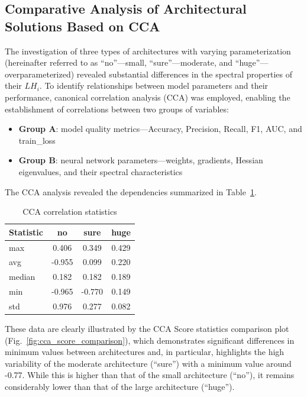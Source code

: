 \documentclass[a4paper,12pt]{article}
\begin{document}
\subsection{Comparative Analysis of Architectural Solutions Based on CCA}

The investigation of three types of architectures with varying parameterization (hereinafter referred to as
``no''—small, ``sure''—moderate, and ``huge''—overparameterized) revealed substantial differences in the
spectral properties of their $LH_i$. To identify relationships between model parameters and their
performance, canonical correlation analysis (CCA) was employed, enabling the establishment of correlations
between two groups of variables:

\begin{itemize}
  \item \textbf{Group A}: model quality metrics—Accuracy, Precision, Recall, F1, AUC, and train\_loss
  \item \textbf{Group B}: neural network parameters—weights, gradients, Hessian eigenvalues, and their
    spectral characteristics
\end{itemize}

The CCA analysis revealed the dependencies summarized in Table~\ref{tab:cca_max}.

\begin{table}[ht]
  \centering
  \begin{tabular}{|l|c|c|c|}
    \hline
    \textbf{Statistic} & \textbf{no} & \textbf{sure} & \textbf{huge} \\
    \hline
    max & 0.406 & 0.349 & 0.429 \\
    avg & -0.955 & 0.099 & 0.220 \\
    median & 0.182 & 0.182 & 0.189 \\
    min & -0.965 & -0.770 & 0.149 \\
    std & 0.976 & 0.277 & 0.082 \\
    \hline
  \end{tabular}
  \caption{CCA correlation statistics}
  \label{tab:cca_max}
\end{table}

These data are clearly illustrated by the CCA Score statistics comparison plot
(Fig.~\ref{fig:cca_score_comparison}), which demonstrates significant differences in minimum values between
architectures and, in particular, highlights the high variability of the moderate architecture (``sure'')
with a minimum value around -0.77. While this is higher than that of the small architecture (``no''), it
remains considerably lower than that of the large architecture (``huge'').
\end{document}
